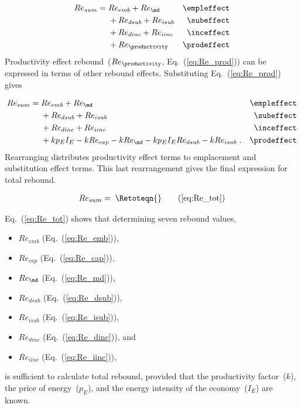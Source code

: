 \begin{align}
  Re_{sum} = \; &Re_{emb} + Re_{\md}      & \mathrm{\empleffect} \nonumber \\
                &+ Re_{dsub} + Re_{isub}   & \mathrm{\subeffect}  \nonumber \\
                &+ Re_{dinc} + Re_{iinc}   & \mathrm{\inceffect}  \nonumber \\
                &+ Re_{\productivity}      & \mathrm{\prodeffect}
\end{align}
%
Productivity effect rebound~($Re_{\productivity}$, Eq.~(\ref{eq:Re_prod}))
can be expressed in terms of other rebound effects.
Substituting Eq.~(\ref{eq:Re_prod}) gives

\begin{align}
  Re_{sum} = \; &Re_{emb} + Re_{\md}      & \mathrm{\empleffect}       \nonumber \\
                &+ Re_{dsub} + Re_{isub}   & \mathrm{\subeffect}        \nonumber \\
                &+ Re_{dinc} + Re_{iinc}   & \mathrm{\inceffect}        \nonumber \\
                &+ k p_E I_E - k Re_{cap} - k Re_{\md} - k p_E I_E Re_{dsub} - k Re_{isub} \; .  & \mathrm{\prodeffect}
\end{align}
%
Rearranging distributes productivity effect terms 
to emplacement and substitution effect terms.
This last rearrangement gives the final expression for total rebound.

\begin{align}
  Re_{sum} = \; \Retoteqn{} \tag{\ref{eq:Re_tot}}
\end{align}

Eq.~(\ref{eq:Re_tot}) shows that determining seven rebound values,

\begin{itemize}

  \item $Re_{emb}$ (Eq.~(\ref{eq:Re_emb})), 

  \item $Re_{cap}$ (Eq.~(\ref{eq:Re_cap})), 
  
  \item $Re_{\md}$ (Eq.~(\ref{eq:Re_md})),
  
  \item $Re_{dsub}$ (Eq.~(\ref{eq:Re_dsub})),
  
  \item $Re_{isub}$ (Eq.~(\ref{eq:Re_isub})), 
  
  \item $Re_{dinc}$ (Eq.~(\ref{eq:Re_dinc})), and
  
  \item $Re_{iinc}$ (Eq.~(\ref{eq:Re_iinc})),

\end{itemize}
%
is sufficient to calculate total rebound, 
provided that 
the productivity factor~($k$),
the price of energy~($p_E$), and
the energy intensity of the economy~($I_E$) 
are known.

